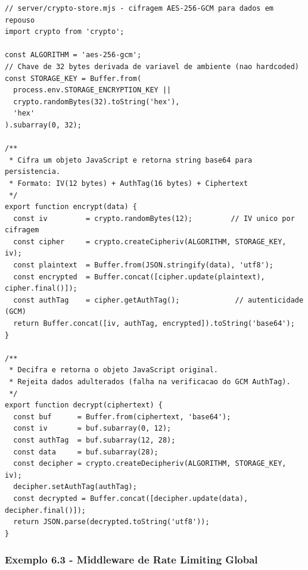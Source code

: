 \documentclass[11pt, a4paper]{article}
\begin{document}
\begin{Verbatim}[fontsize=\small,frame=single,framesep=3pt]
// server/crypto-store.mjs - cifragem AES-256-GCM para dados em repouso
import crypto from 'crypto';

const ALGORITHM = 'aes-256-gcm';
// Chave de 32 bytes derivada de variavel de ambiente (nao hardcoded)
const STORAGE_KEY = Buffer.from(
  process.env.STORAGE_ENCRYPTION_KEY ||
  crypto.randomBytes(32).toString('hex'),
  'hex'
).subarray(0, 32);

/**
 * Cifra um objeto JavaScript e retorna string base64 para persistencia.
 * Formato: IV(12 bytes) + AuthTag(16 bytes) + Ciphertext
 */
export function encrypt(data) {
  const iv         = crypto.randomBytes(12);         // IV unico por cifragem
  const cipher     = crypto.createCipheriv(ALGORITHM, STORAGE_KEY, iv);
  const plaintext  = Buffer.from(JSON.stringify(data), 'utf8');
  const encrypted  = Buffer.concat([cipher.update(plaintext), cipher.final()]);
  const authTag    = cipher.getAuthTag();             // autenticidade (GCM)
  return Buffer.concat([iv, authTag, encrypted]).toString('base64');
}

/**
 * Decifra e retorna o objeto JavaScript original.
 * Rejeita dados adulterados (falha na verificacao do GCM AuthTag).
 */
export function decrypt(ciphertext) {
  const buf      = Buffer.from(ciphertext, 'base64');
  const iv       = buf.subarray(0, 12);
  const authTag  = buf.subarray(12, 28);
  const data     = buf.subarray(28);
  const decipher = crypto.createDecipheriv(ALGORITHM, STORAGE_KEY, iv);
  decipher.setAuthTag(authTag);
  const decrypted = Buffer.concat([decipher.update(data), decipher.final()]);
  return JSON.parse(decrypted.toString('utf8'));
}
\end{Verbatim}

\subsubsection{Exemplo 6.3 - Middleware de Rate Limiting Global}
\end{document}
